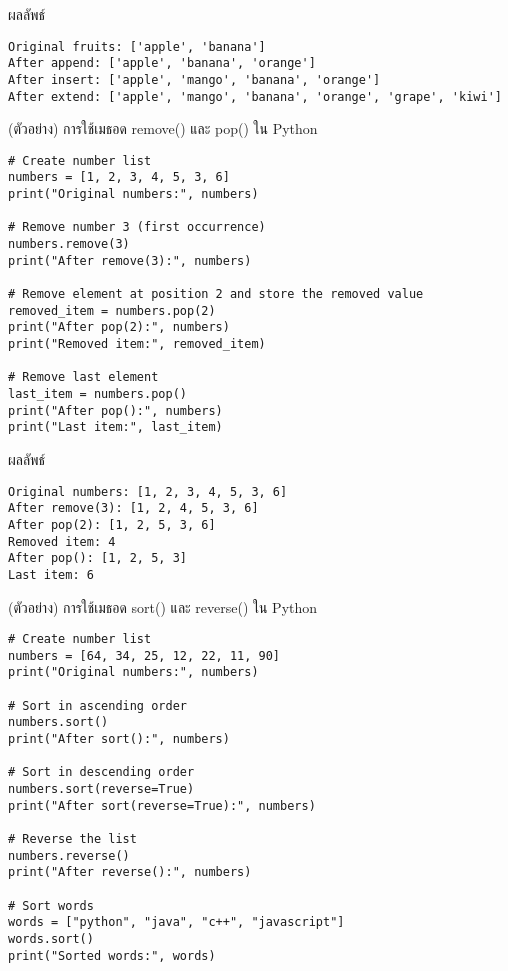 \documentclass[12pt,a4paper]{article}
\begin{document}
\begin{resultbox}{ผลลัพธ์}
\begin{verbatim}
Original fruits: ['apple', 'banana']
After append: ['apple', 'banana', 'orange']
After insert: ['apple', 'mango', 'banana', 'orange']
After extend: ['apple', 'mango', 'banana', 'orange', 'grape', 'kiwi']
\end{verbatim}
\end{resultbox}

\vspace{2cm}

\begin{codebox}{(ตัวอย่าง) การใช้เมธอด remove() และ pop() ใน Python}
\begin{lstlisting}[style=python]
# Create number list
numbers = [1, 2, 3, 4, 5, 3, 6]
print("Original numbers:", numbers)

# Remove number 3 (first occurrence)
numbers.remove(3)
print("After remove(3):", numbers)

# Remove element at position 2 and store the removed value
removed_item = numbers.pop(2)
print("After pop(2):", numbers)
print("Removed item:", removed_item)

# Remove last element
last_item = numbers.pop()
print("After pop():", numbers)
print("Last item:", last_item)
\end{lstlisting}
\end{codebox}

\begin{resultbox}{ผลลัพธ์}
\begin{verbatim}
Original numbers: [1, 2, 3, 4, 5, 3, 6]
After remove(3): [1, 2, 4, 5, 3, 6]
After pop(2): [1, 2, 5, 3, 6]
Removed item: 4
After pop(): [1, 2, 5, 3]
Last item: 6
\end{verbatim}
\end{resultbox}

\begin{codebox}{(ตัวอย่าง) การใช้เมธอด sort() และ reverse() ใน Python}
\begin{lstlisting}[style=python]
# Create number list
numbers = [64, 34, 25, 12, 22, 11, 90]
print("Original numbers:", numbers)

# Sort in ascending order
numbers.sort()
print("After sort():", numbers)

# Sort in descending order
numbers.sort(reverse=True)
print("After sort(reverse=True):", numbers)

# Reverse the list
numbers.reverse()
print("After reverse():", numbers)

# Sort words
words = ["python", "java", "c++", "javascript"]
words.sort()
print("Sorted words:", words)
\end{lstlisting}
\end{codebox}
\end{document}
